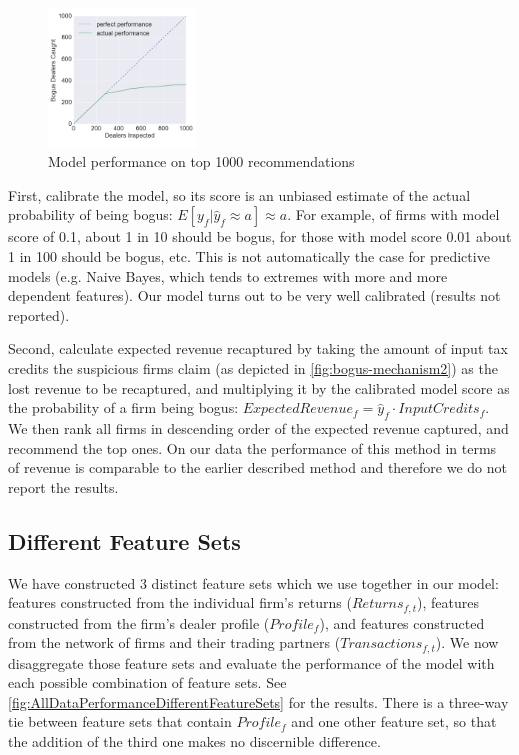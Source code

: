 \begin{figure}
  \includegraphics[width=0.35\textwidth]{figures/PerformanceAllData_v2.png}
  \caption{Model performance on top 1000 recommendations}
  \label{fig:AllDataPerformanceTop1000}
\end{figure}
First, calibrate the model, so its score is an unbiased estimate of the actual probability of being bogus: $E[y_f|\hat{y}_f\approx a]\approx a$. For example, of firms with model score of 0.1, about 1 in 10 should be bogus, for those with model score  0.01 about 1 in 100 should be bogus, etc. This is not automatically the case for predictive models (e.g. Naive Bayes, which tends to extremes with more and more dependent features). Our model turns out to be very well calibrated (results not reported).

Second, calculate expected revenue recaptured by taking the amount of input tax credits the suspicious firms claim (as depicted in \cref{fig:bogus-mechanism2}) as the lost revenue to be recaptured, and multiplying it by the calibrated model score as the probability of a firm being bogus: $ExpectedRevenue_f=\hat{y}_f\cdot InputCredits_f$. We then rank all firms in descending order of the expected revenue captured, and recommend the top ones. On our data the performance of this method in terms of revenue is comparable to the earlier described method and therefore we do not report the results.

\subsection{Different Feature Sets}
\label{subsec:feature-sets}
We have constructed 3 distinct feature sets which we use together in our model: features constructed from the individual firm's returns ($Returns_{f,t}$), features constructed from the firm's dealer profile ($Profile_f$), and features constructed from the network of firms and their trading partners ($Transactions_{f,t}$). We now disaggregate those feature sets and evaluate the performance of the model with each possible combination of feature sets. See \cref{fig:AllDataPerformanceDifferentFeatureSets} for the results. There is a three-way tie between feature sets that contain $Profile_f$ and one other feature set, so that the addition of the third one makes no discernible difference.

